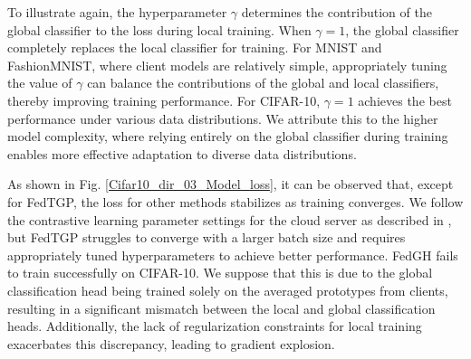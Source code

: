 \documentclass[journal]{IEEEtran}
\begin{document}
To illustrate again, the hyperparameter $\gamma$ determines the contribution of the global classifier to the loss during local training. When $\gamma=1$, the global classifier completely replaces the local classifier for training. For MNIST and FashionMNIST, where client models are relatively simple, appropriately tuning the value of $\gamma$ can balance the contributions of the global and local classifiers, thereby improving training performance. For CIFAR-10, $\gamma=1$ achieves the best performance under various data distributions. We attribute this to the higher model complexity, where relying entirely on the global classifier during training enables more effective adaptation to diverse data distributions.

As shown in Fig. \ref{Cifar10_dir_03_Model_loss}, it can be observed that, except for FedTGP, the loss for other methods stabilizes as training converges. We follow the contrastive learning parameter settings for the cloud server as described in \cite{zhang_fedtgp_2024}, but FedTGP struggles to converge with a larger batch size and requires appropriately tuned hyperparameters to achieve better performance. FedGH fails to train successfully on CIFAR-10. We suppose that this is due to the global classification head being trained solely on the averaged prototypes from clients, resulting in a significant mismatch between the local and global classification heads. Additionally, the lack of regularization constraints for local training exacerbates this discrepancy, leading to gradient explosion.
\end{document}
